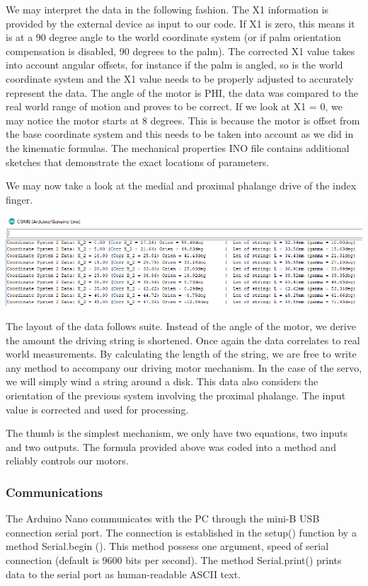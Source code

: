 \documentclass{article}
\begin{document}
We may interpret the data in the following fashion. The X1 information is provided by the external device as input to our code. If X1 is zero, this means it is at a 90 degree angle to the world coordinate system (or if palm orientation compensation is disabled, 90 degrees to the palm). The corrected X1 value takes into account angular offsets, for instance if the palm is angled, so is the world coordinate system and the X1 value needs to be properly adjusted to accurately represent the data. The angle of the motor is PHI, the data was compared to the real world range of motion and proves to be correct. If we look at X1 = 0, we may notice the motor starts at 8 degrees. This is because the motor is offset from the base coordinate system and this needs to be taken into account as we did in the kinematic formulas. The mechanical properties INO file contains additional sketches that demonstrate the exact locations of parameters.

We may now take a look at the medial and proximal phalange drive of the index finger.

\begin{center}
\includegraphics[width=\textwidth]{IMG/IK_03.png}
\end{center}

The layout of the data follows suite. Instead of the angle of the motor, we derive the amount the driving string is shortened. Once again the data correlates to real world measurements. By calculating the length of the string, we are free to write any method to accompany our driving motor mechanism. In the case of the servo, we will simply wind a string around a disk. This data also considers the orientation of the previous system involving the proximal phalange. The input value is corrected and used for processing. 

The thumb is the simplest mechanism, we only have two equations, two inputs and two outputs. The formula provided above was coded into a method and reliably controls our motors.

\subsubsection{Communications}
The Arduino Nano communicates with the PC through the mini-B USB connection serial port. The connection is established in the setup() function by a method Serial.begin (). This method possess one argument, speed of serial connection (default is 9600 bits per second). The method Serial.print() prints data to the serial port as human-readable ASCII text.
\end{document}

